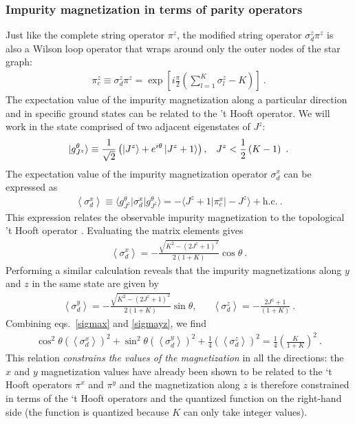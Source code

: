 \documentclass[10pt]{iopart}
\begin{document}
\subsubsection{Impurity magnetization in terms of parity operators}
Just like the complete string operator \(\pi^z\), the modified string operator \(\sigma_d^z \pi^z\) is also a Wilson loop operator that wraps around only the outer nodes of the star graph:
\begin{eqnarray}
	\pi^z_c \equiv \sigma_d^z \pi^z = \exp\left[i \frac{\pi}{2} \left(\sum_{l=1}^K \sigma^z_l - K\right)\right] ~.
\end{eqnarray}
The expectation value of the impurity magnetization along a particular direction and in specific ground states can be related to the 't Hooft operator. We will work in the state comprised of two adjacent eigenstates of \(J^z\):
\begin{eqnarray}
	\ket{g^\theta_{J^z}} \equiv \frac{1}{\sqrt 2}\left( \ket{J^z} + e^{i\theta}\ket{J^z+1}\right), && J^z < \frac{1}{2}\left( K-1 \right)~.
\end{eqnarray}
The expectation value of the impurity magnetization operator \(\sigma_d^x\) can be expressed as
\begin{eqnarray}
	\left<\sigma_d^x\right> \equiv \langle g^\theta_{J^z} \vert \sigma_d^x \vert g^\theta_{J^z}\rangle = - \langle J^z + 1 \vert \pi^x_c \vert -J^z \rangle + \text{h.c.}~.
\end{eqnarray}
This expression relates the observable impurity magnetization to the topological 't Hooft operator \cite{Maric2020}. Evaluating the matrix elements gives
\begin{eqnarray}
	\label{sigmax}
	\left<\sigma_d^x\right> = - \frac{\sqrt{K^2 - (2J^z + 1)^2}}{2(1+K)}\cos \theta~.
\end{eqnarray}
Performing a similar calculation reveals that the impurity magnetizations along \(y\) and \(z\) in the same state are given by
\begin{eqnarray}
	\label{sigmayz}
	\left<\sigma_d^y\right> = - \frac{\sqrt{K^2 - (2J^z + 1)^2}}{2(1+K)}\sin \theta, &&\left<\sigma_d^z\right> = - \frac{2J^z + 1}{(1+K)}~.
\end{eqnarray}
Combining eqs.~\ref{sigmax} and \ref{sigmayz}, we find
\begin{eqnarray}
	\cos^2\theta\left(\left<\sigma^x_d\right>\right)^2 + \sin^2\theta\left(\left<\sigma^y_d\right>\right)^2 + \frac{1}{4}\left(\left<\sigma^z_d\right>\right)^2 = \frac{1}{4}\left(\frac{K}{1+K}\right)^2~.
\end{eqnarray}
This relation \textit{constrains the values of the magnetization} in all the directions: the \(x\) and \(y\) magnetization values have already been shown to be related to the `t Hooft operators \(\pi^x\) and \(\pi^y\) and the magnetization along \(z\) is therefore constrained in terms of the `t Hooft operators and the quantized function on the right-hand side (the function is quantized because \(K\) can only take integer values).
\end{document}
